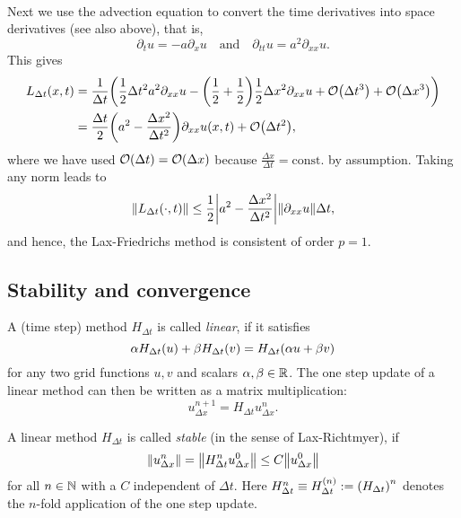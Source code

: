 \begin{example}
\begin{align*}
	\end{align*}
	Next we use the advection equation to convert the time derivatives into space derivatives (see also above), that is,
	\[
		\partial_t u = -a\partial_x u \quad \text{and} \quad \partial_{tt} u = a^2 \partial_{xx}u.
	\]
	This gives
	\begin{align*}
		L_{\Delta t}\parentheses*{x, t} &= \frac{1}{\Delta t}\parentheses*{\frac{1}{2}\Delta t^2 a^2 \partial_{xx}u - \parentheses*{\frac{1}{2} + \frac{1}{2}}\frac{1}{2}\Delta x^2 \partial_{xx}u + \mathcal{O}\parentheses*{\Delta t^3} + \mathcal{O}\parentheses*{\Delta x^3}}\\
		&= \frac{\Delta t}{2}\parentheses*{a^2 - \frac{\Delta x^2}{\Delta t^2}}\partial_{xx}u\parentheses*{x, t} + \mathcal{O}\parentheses*{\Delta t^2},
	\end{align*}
	where we have used \(\mathcal{O}\parentheses*{\Delta t} = \mathcal{O}\parentheses*{\Delta x}\) because \(\frac{\Delta x}{\Delta t} = \text{const.}\) by assumption.
	Taking any norm leads to
	\[
		\norm*{L_{\Delta t}\parentheses*{\cdot, t}} \le \frac{1}{2}\absolute*{a^2 - \frac{\Delta x^2}{\Delta t^2}}\norm*{\partial_{xx}u}\Delta t,
	\]
	and hence, the Lax-Friedrichs method is consistent of order \(p = 1\).
\end{example}


\subsection{Stability and convergence}

\begin{definition}
	A (time step) method \(H_{\Delta t}\) is called \emph{linear}, if it satisfies
	\[
		\alpha H_{\Delta t}\parentheses*{u} + \beta H_{\Delta t}\parentheses*{v} = H_{\Delta t}\parentheses*{\alpha u + \beta v}
	\]
	for any two grid functions \(u, v\) and scalars \(\alpha, \beta \in \R\).
	The one step update of a linear method can then be written as a matrix multiplication:
	\[
		u_{\Delta x}^{n + 1} = H_{\Delta t}u_{\Delta x}^n.
	\]
\end{definition}

\begin{definition}[Stability]
	A linear method \(H_{\Delta t}\) is called \emph{stable} (in the sense of Lax-Richtmyer), if
	\[
		\norm*{u_{\Delta x}^n} = \norm*{H_{\Delta t}^n u_{\Delta x}^0} \le C\norm*{u_{\Delta x}^0}
	\]
	for all \(n \in \N\) with a \(C\) independent of \(\Delta t\).
	Here \(H_{\Delta t}^n \equiv H_{\Delta t}^{\parentheses*{n}} := \parentheses*{H_{\Delta t}}^n\) denotes the \(n\)-fold application of the one step update.
\end{definition}

